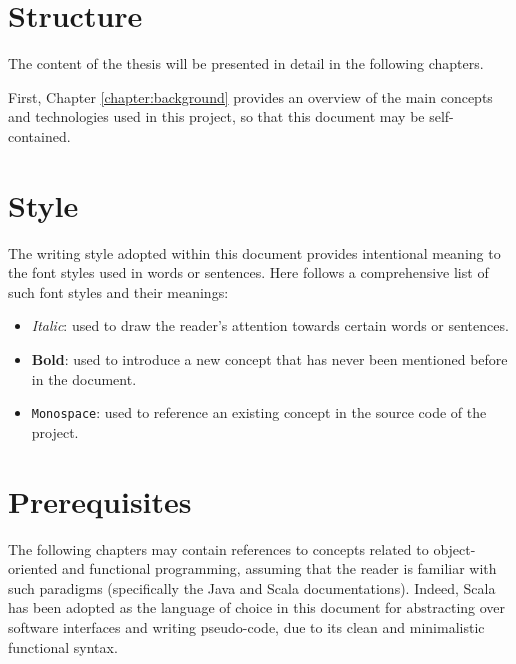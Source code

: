 \section{Structure}

The content of the thesis will be presented in detail in the following
chapters.

First, Chapter \ref{chapter:background} provides an overview of the main
concepts and technologies used in this project, so that this document may be
self-contained.


\section{Style}

The writing style adopted within this document provides intentional meaning to
the font styles used in words or sentences. Here follows a comprehensive list
of such font styles and their meanings:

\begin{itemize}
  \item \textit{Italic}: used to draw the reader's attention towards certain
        words or sentences.
  \item \textbf{Bold}: used to introduce a new concept that has never been
        mentioned before in the document.
  \item \texttt{Monospace}: used to reference an existing concept in the source
        code of the project.
\end{itemize}

\section{Prerequisites}

The following chapters may contain references to concepts related to
object-orient\-ed and functional programming, assuming that the reader is
familiar with such paradigms (specifically the Java \cite{Java} and Scala
\cite{Scala} documentations). Indeed, Scala has been adopted as the language of
choice in this document for abstracting over software interfaces and writing
pseudo-code, due to its clean and minimalistic functional syntax.
